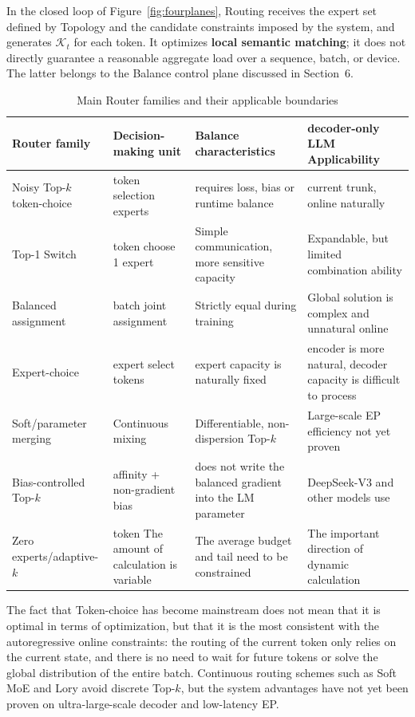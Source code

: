 \documentclass[10pt,a4paper,fontset=none]{ctexart}
\newcommand{\term}[1]{\textbf{#1}}
\begin{document}
In the closed loop of Figure~\ref{fig:fourplanes}, Routing receives the expert set defined by Topology and the candidate constraints imposed by the system, and generates $\mathcal{K}_t$ for each token. It optimizes \term{local semantic matching}; it does not directly guarantee a reasonable aggregate load over a sequence, batch, or device. The latter belongs to the Balance control plane discussed in Section~6.

\begin{table}[htbp]
\centering
\caption{Main Router families and their applicable boundaries}
\label{tab:router}
\small
\begin{tabularx}{\textwidth}{p{}p{}Y Y}
\toprule
Router family & Decision-making unit & Balance characteristics & decoder-only LLM Applicability \\
\midrule
Noisy Top-$k$ token-choice & token selection experts & requires loss, bias or runtime balance & current trunk, online naturally \\
Top-1 Switch & token choose 1 expert & Simple communication, more sensitive capacity & Expandable, but limited combination ability \\
Balanced assignment & batch joint assignment & Strictly equal during training & Global solution is complex and unnatural online \\
Expert-choice & expert select tokens & expert capacity is naturally fixed & encoder is more natural, decoder capacity is difficult to process \\
Soft/parameter merging & Continuous mixing & Differentiable, non-dispersion Top-$k$ & Large-scale EP efficiency not yet proven \\
Bias-controlled Top-$k$ & affinity + non-gradient bias & does not write the balanced gradient into the LM parameter & DeepSeek-V3 and other models use \\
Zero experts/adaptive-$k$ & token The amount of calculation is variable & The average budget and tail need to be constrained & The important direction of dynamic calculation \\
\bottomrule
\end{tabularx}
\end{table}

The fact that Token-choice has become mainstream does not mean that it is optimal in terms of optimization, but that it is the most consistent with the autoregressive online constraints: the routing of the current token only relies on the current state, and there is no need to wait for future tokens or solve the global distribution of the entire batch. Continuous routing schemes such as Soft MoE and Lory avoid discrete Top-$k$, but the system advantages have not yet been proven on ultra-large-scale decoder and low-latency EP\cite{puigcerver2023softmoe,zhong2024lory}.
\end{document}
